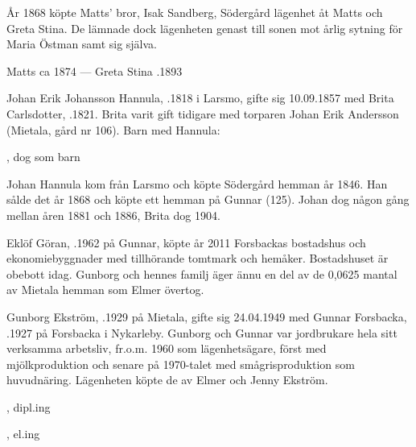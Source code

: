 År 1868 köpte Matts' bror, Isak Sandberg, Södergård lägenhet åt Matts och Greta Stina. De lämnade dock lägenheten genast till sonen  mot årlig sytning för Maria Östman samt sig själva.

Matts \textdied ca 1874  ---  Greta Stina .1893


Johan Erik Johansson Hannula, .1818 i Larsmo, gifte sig 10.09.1857 med Brita Carlsdotter, .1821. Brita varit gift tidigare med torparen Johan Erik Andersson (Mietala, gård nr 106). Barn med Hannula:
\begin{jhchildren}
  \item {}
  \item {}
  \item {}, dog som barn
  \item {}
\end{jhchildren}

Johan Hannula kom från Larsmo och köpte Södergård hemman år 1846. Han sålde det år 1868 och köpte ett hemman på Gunnar (125). Johan dog någon gång mellan åren 1881 och 1886, Brita dog 1904.






Eklöf Göran, .1962 på Gunnar, köpte år 2011 Forsbackas bostadshus och ekonomiebyggnader med tillhörande tomtmark och hemåker. Bostadshuset är obebott idag. Gunborg och hennes familj äger ännu en del av de 0,0625 mantal av Mietala hemman som Elmer övertog.


Gunborg Ekström, .1929 på Mietala, gifte sig 24.04.1949 med Gunnar Forsbacka, .1927 på Forsbacka i Nykarleby. Gunborg och Gunnar var jordbrukare hela sitt verksamma arbetsliv, fr.o.m. 1960 som lägenhetsägare, först med mjölkproduktion och senare på 1970-talet med smågrisproduktion som huvudnäring. Lägenheten köpte de av Elmer och Jenny Ekström.
\begin{jhchildren}
  \item {}, dipl.ing
  \item {}, el.ing
\end{jhchildren}

